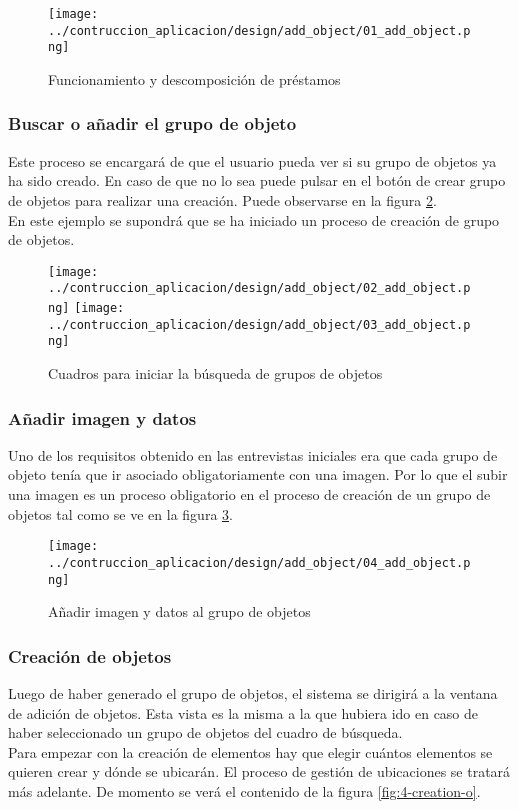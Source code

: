 \begin{figure}[ht]
    \centering
    \texttt{[image: ../contruccion\_aplicacion/design/add\_object/01\_add\_object.png]}
    \caption{Funcionamiento y descomposición de préstamos}\label{fig:1-creation-o}
\end{figure}

\subsubsection{Buscar o añadir el grupo de objeto}
Este proceso se encargará de que el usuario pueda ver si su grupo de objetos ya ha sido creado. En caso de que no lo sea puede pulsar en el botón de crear grupo de objetos para realizar una creación. Puede observarse en la figura \ref{fig:2-creation-o}.
\\En este ejemplo se supondrá que se ha iniciado un proceso de creación de grupo de objetos.

\begin{figure}[ht]
    \centering
    \texttt{[image: ../contruccion\_aplicacion/design/add\_object/02\_add\_object.png]}
    \texttt{[image: ../contruccion\_aplicacion/design/add\_object/03\_add\_object.png]}
    \caption{Cuadros para iniciar la búsqueda de grupos de objetos}\label{fig:2-creation-o}
\end{figure}

\subsubsection{Añadir imagen y datos}
Uno de los requisitos obtenido en las entrevistas iniciales era que cada grupo de objeto tenía que ir asociado obligatoriamente con una imagen. Por lo que el subir una imagen es un proceso obligatorio en el proceso de creación de un grupo de objetos tal como se ve en la figura \ref{fig:3-creation-o}.

\begin{figure}[ht]
    \centering
    \texttt{[image: ../contruccion\_aplicacion/design/add\_object/04\_add\_object.png]}
    \caption{Añadir imagen y datos al grupo de objetos}\label{fig:3-creation-o}
\end{figure}

\subsubsection{Creación de objetos}
Luego de haber generado el grupo de objetos, el sistema se dirigirá a la ventana de adición de objetos. Esta vista es la misma a la que hubiera ido en caso de haber seleccionado un grupo de objetos del cuadro de búsqueda.
\\Para empezar con la creación de elementos hay que elegir cuántos elementos se quieren crear y dónde se ubicarán. El proceso de gestión de ubicaciones se tratará más adelante. De momento se verá el contenido de la figura \ref{fig:4-creation-o}.

